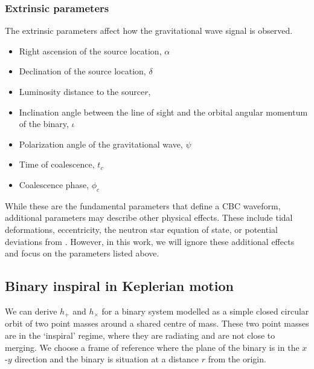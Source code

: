 \subsubsection{Extrinsic parameters}
The extrinsic parameters affect how the gravitational wave signal is observed.
\begin{itemize}
   \item Right ascension of the source location, $\alpha$ 
   \item Declination of the source location, $\delta$
   \item Luminosity distance to the source$r$, 
   \item Inclination angle between the line of sight and the orbital angular momentum of the binary, $\iota$
   \item Polarization angle of the gravitational wave, $\psi$
   \item Time of coalescence, $t_{c}$
   \item Coalescence phase, $\phi_{c}$ 
\end{itemize}

While these are the fundamental parameters that define a CBC waveform, additional parameters may describe other physical effects. These include tidal deformations, eccentricity, the neutron star equation of state, or potential deviations from \GR. However, in this work, we will ignore these additional effects and focus on the parameters listed above.

\subsection{\label{}Binary inspiral in Keplerian motion}

We can derive $h_{+}$ and $h_{\times}$ for a binary system modelled as a simple closed circular orbit of two point masses around a shared centre of mass. These two point masses are in the `inspiral' regime, where they are radiating \gws and are not close to merging. We choose a frame of reference where the plane of the binary is in the $x$-$y$ direction and the binary is situation at a distance $r$ from the origin.

